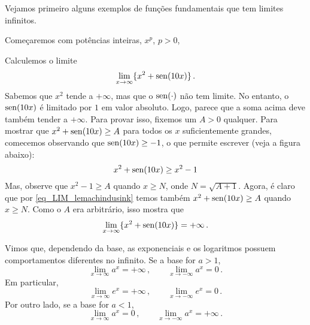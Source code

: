 Vejamos primeiro alguns exemplos de funções fundamentais que tem
limites infinitos.

Começaremos com potências inteiras, $x^p$, $p>0$,

\begin{ex}
Calculemos o limite
\[ 
\lim_{x\to\infty}\{x^2+\operatorname{sen}(10 x)\}\,.
\]
Sabemos que $x^2$ tende a $+\infty$, mas que o $\operatorname{sen} (\cdot)$ não tem limite. 
No entanto, o $\operatorname{sen} (10 x)$ é limitado por $1$ em valor absoluto.
Logo,
parece que a soma acima deve também tender a
$+\infty$. Para provar isso, fixemos um $A>0$ qualquer. Para mostrar
que $x^2+\operatorname{sen} (10x)\geq A$ para todos os $x$ suficientemente grandes,
comecemos observando que $\operatorname{sen} (10x)\geq -1$, o que permite escrever (veja a
figura abaixo):
\begin{equation}\label{eq_LIM_lemachindusink} 
x^2+\operatorname{sen} (10x)\geq x^2-1
\end{equation}
Mas, observe que $x^2-1\geq A$ quando $x\geq N$, onde
$N=\sqrt{A+1}$.
Agora, é claro que por \eqref{eq_LIM_lemachindusink}
temos também $x^2+\operatorname{sen} (10x)\geq A$ quando $x\geq N$.
Como o $A$ era arbitrário, isso mostra que
\[ 
\lim_{x\to\infty}\{x^2+\operatorname{sen} (10x)\}=+\infty\,.
\]
\begin{center}
\begin{bmlimage}\end{bmlimage}
\end{center}
\end{ex}

Vimos que, dependendo da base, as exponenciais e os
logaritmos possuem comportamentos diferentes no infinito. Se a base
for $a>1$,
\begin{equation}\label{eq_Lim_expinf_a} 
\boxed{
\lim_{x\to\infty}a^x=+\infty\,,\quad \quad
\lim_{x\to-\infty}a^x=0\,.
}
\end{equation}
Em particular,
\begin{equation}\label{eq_Lim_expinf_b} 
\boxed{
\lim_{x\to\infty}e^x=+\infty\,,\quad \quad
\lim_{x\to-\infty}e^x=0\,.
}
\end{equation}
Por outro lado, se a base
for $a<1$,
\begin{equation}\label{eq_Lim_expinf_c} 
\boxed{
\lim_{x\to\infty}a^x=0\,,\quad \quad
\lim_{x\to-\infty}a^x=+\infty\,.
}
\end{equation}

